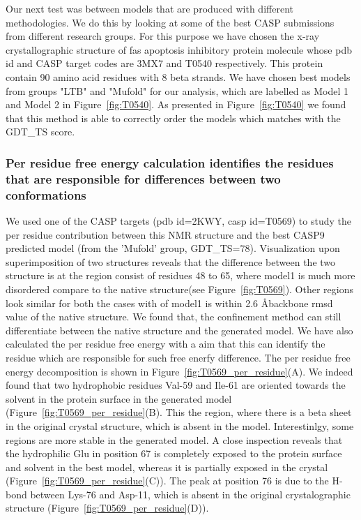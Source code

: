 \documentclass[12pt]{article}
\begin{document}
Our next test was between models that are produced with different methodologies. We do this by
looking at some of the best CASP submissions from different research groups. For this purpose we
have chosen the x-ray crystallographic structure of fas apoptosis inhibitory protein molecule whose
pdb id and CASP target codes are 3MX7 and T0540 respectively. This protein contain 90 amino acid
residues with 8 beta strands. We have chosen best models from groups "LTB" and "Mufold" for our
analysis, which are labelled as Model 1 and Model 2 in Figure~\ref{fig:T0540}. As presented in
Figure~\ref{fig:T0540} we found that this method is able to correctly order the models which matches
with the GDT\_TS score. 

\subsubsection{Per residue free energy calculation identifies the residues that are responsible for
differences between two conformations}

We used one of the CASP targets (pdb id=2KWY, casp id=T0569) to study the per residue contribution
between this NMR structure and the best CASP9 predicted model (from the 'Mufold' group, GDT\_TS=78).
Visualization upon superimposition of two structures reveals that the difference between the two
structure is at the region consist of residues 48 to 65, where model1 is much more disordered
compare to the native structure(see Figure~\ref{fig:T0569}). Other regions look similar for both the
cases with of model1 is within 2.6 \AA backbone rmsd value of the native structure. We found that,
the confinement method can still differentiate between the native structure and the generated model.
We have also calculated the per residue free energy with a aim that this can identify the residue
which are responsible for such free enerfy difference. The per residue free energy decomposition is
shown in  Figure~\ref{fig:T0569_per_residue}(A). We indeed found that two hydrophobic residues
Val-59 and Ile-61 are oriented towards the solvent in the protein surface in the generated model
(Figure~\ref{fig:T0569_per_residue}(B). This the region, where there is a beta sheet in the original
crystal structure, which is absent in the model. Interestinlgy, some regions are more stable in the
generated model. A close inspection reveals that the hydrophilic Glu in position 67 is completely
exposed to the protein surface and solvent in the best model, whereas it is partially exposed in the
crystal (Figure~\ref{fig:T0569_per_residue}(C)). The peak at position 76 is due to the H-bond
between Lys-76 and Asp-11, which is absent in the original crystalographic structure
(Figure~\ref{fig:T0569_per_residue}(D)). 
\end{document}

